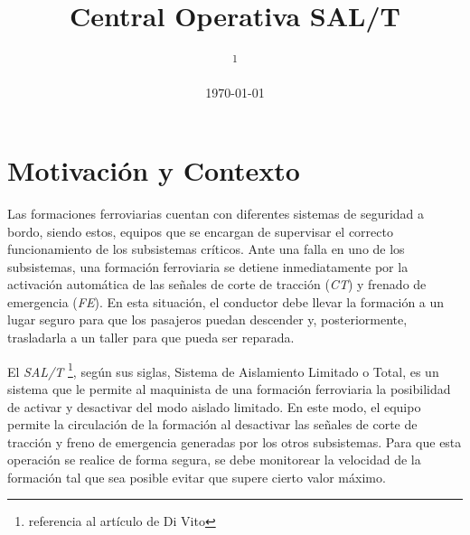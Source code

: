 \documentclass[10pt, a4paper, twocolumn]{article} %
\title{Central Operativa SAL/T} %
\author{
	\authorstyle{Matías Sambrizzi \textsuperscript{1} and Fernando Iglesias\textsuperscript{1}} %
	\newline\newline %
	\textsuperscript{1}\institution{Universidad de Buenos Aires, Buenos Aires, Argentina}\\ %
}
\date{\today} %
\begin{document}
\maketitle %

\thispagestyle{firstpage} %






\section{Motivación y Contexto}

Las formaciones ferroviarias cuentan con diferentes sistemas de seguridad a bordo, siendo estos, equipos que se encargan de supervisar el correcto funcionamiento de los subsistemas críticos. Ante una falla en uno de los subsistemas, una formación ferroviaria se detiene inmediatamente por la activación automática de las señales de corte de tracción (\textit{CT}) y frenado de emergencia (\textit{FE}). En esta situación, el conductor debe llevar la formación a un lugar seguro para que los pasajeros puedan descender y, posteriormente, trasladarla a un taller para que pueda ser reparada.

El \textit{SAL/T} \footnote{referencia al artículo de Di Vito}, según sus siglas, Sistema de Aislamiento Limitado o Total, es un sistema que le permite al maquinista de una formación ferroviaria la posibilidad de activar y desactivar del modo aislado limitado. En este modo, el equipo permite la circulación de la formación al desactivar las señales de corte de tracción y freno de emergencia generadas por los otros subsistemas. Para que esta operación se realice de forma segura, se debe monitorear la velocidad de la formación tal que sea posible evitar que supere cierto valor máximo. 
\end{document}
